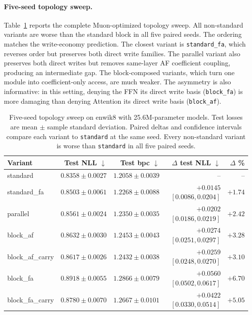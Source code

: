 \documentclass[letterpaper]{article}
\begin{document}
\paragraph{Five-seed topology sweep.}
Table~\ref{tab:topology} reports the complete Muon-optimized topology sweep.
All non-standard variants are worse than the standard block in all five paired
seeds. The ordering matches the write-economy prediction. The closest variant
is \texttt{standard\_fa}, which reverses order but preserves both direct write
families. The parallel variant also preserves both direct writes but removes
same-layer AF coefficient coupling, producing an intermediate gap. The
block-composed variants, which turn one module into coefficient-only access,
are much weaker. The asymmetry is also informative: in this setting, denying
the FFN its direct write basis (\texttt{block\_fa}) is more damaging than
denying Attention its direct write basis (\texttt{block\_af}).

\begin{table}[t]
\centering
\caption{Five-seed topology sweep on enwik8 with 25.6M-parameter models. Test
losses are mean $\pm$ sample standard deviation. Paired deltas and confidence
intervals compare each variant to \texttt{standard} at the same seed. Every
non-standard variant is worse than \texttt{standard} in all five paired seeds.}
\label{tab:topology}
\begin{tabular}{lrrrr}
\toprule
Variant & Test NLL $\downarrow$ & Test bpc $\downarrow$ & $\Delta$ test NLL $\downarrow$ & $\Delta$ \% \\
\midrule
standard & $0.8358 \pm 0.0027$ & $1.2058 \pm 0.0039$ & -- & -- \\
standard\_fa & $0.8503 \pm 0.0061$ & $1.2268 \pm 0.0088$ & $+0.0145$ $[0.0086,0.0204]$ & $+1.74$ \\
parallel & $0.8561 \pm 0.0024$ & $1.2350 \pm 0.0035$ & $+0.0202$ $[0.0186,0.0219]$ & $+2.42$ \\
block\_af & $0.8632 \pm 0.0030$ & $1.2453 \pm 0.0043$ & $+0.0274$ $[0.0251,0.0297]$ & $+3.28$ \\
block\_af\_carry & $0.8617 \pm 0.0026$ & $1.2432 \pm 0.0038$ & $+0.0259$ $[0.0248,0.0270]$ & $+3.10$ \\
block\_fa & $0.8918 \pm 0.0055$ & $1.2866 \pm 0.0079$ & $+0.0560$ $[0.0502,0.0617]$ & $+6.70$ \\
block\_fa\_carry & $0.8780 \pm 0.0070$ & $1.2667 \pm 0.0101$ & $+0.0422$ $[0.0330,0.0514]$ & $+5.05$ \\
\bottomrule
\end{tabular}
\end{table}
\end{document}
